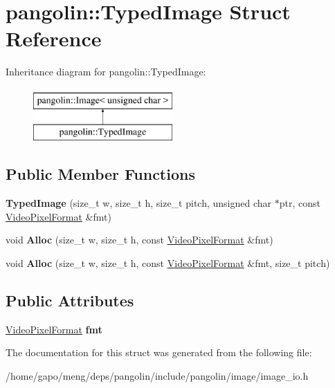 \hypertarget{structpangolin_1_1_typed_image}{}\section{pangolin\+:\+:Typed\+Image Struct Reference}
\label{structpangolin_1_1_typed_image}
Inheritance diagram for pangolin\+:\+:Typed\+Image\+:\begin{figure}[H]
\begin{center}
\leavevmode
\includegraphics[height=2.000000cm]{structpangolin_1_1_typed_image}
\end{center}
\end{figure}
\subsection*{Public Member Functions}
\begin{DoxyCompactItemize}
\item 
{\bfseries Typed\+Image} (size\+\_\+t w, size\+\_\+t h, size\+\_\+t pitch, unsigned char $\ast$ptr, const \hyperlink{structpangolin_1_1_video_pixel_format}{Video\+Pixel\+Format} \&fmt)\hypertarget{structpangolin_1_1_typed_image_ade52b7d81698f1f3e79d07162c6210af}{}\label{structpangolin_1_1_typed_image_ade52b7d81698f1f3e79d07162c6210af}

\item 
void {\bfseries Alloc} (size\+\_\+t w, size\+\_\+t h, const \hyperlink{structpangolin_1_1_video_pixel_format}{Video\+Pixel\+Format} \&fmt)\hypertarget{structpangolin_1_1_typed_image_a7d09a86f50f02e499e906379f1953ae3}{}\label{structpangolin_1_1_typed_image_a7d09a86f50f02e499e906379f1953ae3}

\item 
void {\bfseries Alloc} (size\+\_\+t w, size\+\_\+t h, const \hyperlink{structpangolin_1_1_video_pixel_format}{Video\+Pixel\+Format} \&fmt, size\+\_\+t pitch)\hypertarget{structpangolin_1_1_typed_image_a8d1456f71e60966f812e15cfde88ff83}{}\label{structpangolin_1_1_typed_image_a8d1456f71e60966f812e15cfde88ff83}

\end{DoxyCompactItemize}
\subsection*{Public Attributes}
\begin{DoxyCompactItemize}
\item 
\hyperlink{structpangolin_1_1_video_pixel_format}{Video\+Pixel\+Format} {\bfseries fmt}\hypertarget{structpangolin_1_1_typed_image_aced9e14a5a9f1a04b038b22458413104}{}\label{structpangolin_1_1_typed_image_aced9e14a5a9f1a04b038b22458413104}

\end{DoxyCompactItemize}


The documentation for this struct was generated from the following file\+:\begin{DoxyCompactItemize}
\item 
/home/gapo/meng/deps/pangolin/include/pangolin/image/image\+\_\+io.\+h\end{DoxyCompactItemize}
